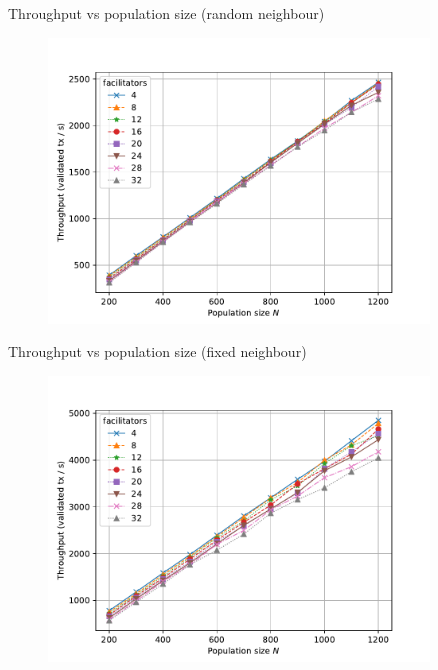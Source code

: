 \documentclass{beamer}
\begin{document}
\begin{frame}{Throughput vs population size (random neighbour)}
  \begin{figure}[h]
  \includegraphics[width=0.9\textwidth]{neighbour-random/throughput-vs-population}
  \centering
  \end{figure}
\end{frame}

\begin{frame}{Throughput vs population size (fixed neighbour)}
  \begin{figure}[h]
  \includegraphics[width=0.9\textwidth]{neighbour-fixed/throughput-vs-population}
  \centering
  \end{figure}
\end{frame}
\end{document}
